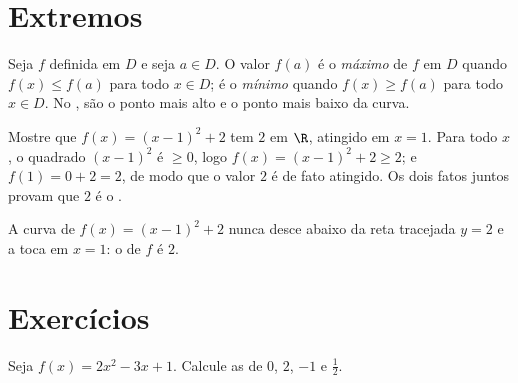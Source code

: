\section{Extremos}

\begin{definition}\label{def:g10:functions:extrema}
Seja $f$ definida em $D$ e seja $a \in D$. O valor $f(a)$ é o
\emph{máximo} de $f$ em $D$ quando $f(x) \leq f(a)$ para
todo $x \in D$; é o \emph{mínimo} quando $f(x) \geq f(a)$
para todo $x \in D$. No , são o ponto mais alto e o ponto mais
baixo da curva.
\end{definition}

\begin{example}\label{ex:g10:functions:extremum}
Mostre que $f(x) = (x - 1)^2 + 2$ tem  $2$ em $\R$, atingido em
$x = 1$. Para todo $x$, o quadrado $(x-1)^2$ é $\geq 0$, logo
$f(x) = (x-1)^2 + 2 \geq 2$; e $f(1) = 0 + 2 = 2$, de modo que o valor $2$
é de fato atingido. Os dois fatos juntos provam que $2$ é o .
\end{example}

\begin{omfigure}

{\small A curva de $f(x) = (x-1)^2 + 2$ nunca desce abaixo da reta
tracejada $y = 2$ e a toca em $x = 1$: o  de $f$ é $2$.}
\end{omfigure}

\section{Exercícios}

\begin{exercise}[$\star$]\label{exo:g10:functions:1}
Seja $f(x) = 2x^2 - 3x + 1$. Calcule as  de $0$, $2$, $-1$ e
$\frac12$.
\end{exercise}

